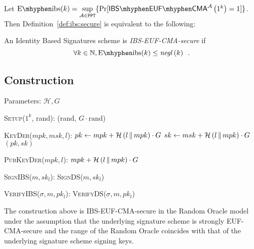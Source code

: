     Let $\mathrm{E \mhyphen ibs}(k) = \underset{\adversary \in
    \mathtt{PPT}}{\sup}\{\Pr[\mathsf{IBS \mhyphen EUF \mhyphen
    CMA}^{\adversary}\left(1^k\right) = 1]\}$. Then
    Definition~\ref{def:ibs:secure} is equivalent to the following:

    \begin{definition}
      \label{def:ibs:secure:sup}
      An Identity Based Signatures scheme is \emph{\textsf{IBS-EUF-CMA}-secure}
      if
      \begin{equation*}
        \forall k \in \mathbb{N}, \mathrm{E \mhyphen ibs}(k) \leq
        \mathit{negl}\left(k\right) \enspace.
      \end{equation*}
    \end{definition}

  \subsection{Construction}
    Parameters: $\mathcal{H}, G$
    \begin{algorithmic}[0]
      \State \textsc{Setup}($1^k$, rand):
      \Indent
        \State \Return (rand, $G \cdot \mathrm{rand}$)
      \EndIndent
    \end{algorithmic}

    \begin{algorithmic}[0]
      \State \textsc{KeyDer}($mpk, msk, l$):
      \Indent
        \State $pk \gets mpk + \mathcal{H}\left(l \,\|\, mpk\right) \cdot G$
        \State $sk \gets msk + \mathcal{H}\left(l \,\|\, mpk\right) \cdot G$
        \State \Return $(pk, sk)$
      \EndIndent
    \end{algorithmic}

    \begin{algorithmic}[0]
      \State \textsc{PubKeyDer}($mpk, l$):
      \Indent
        \State \Return $mpk + \mathcal{H}\left(l \,\|\, mpk\right) \cdot G$
      \EndIndent
    \end{algorithmic}

    \begin{algorithmic}[0]
      \State \textsc{SignIBS}($m, sk_l$):
      \Indent
        \State \Return \textsc{SignDS}($m, sk_l$)
      \EndIndent
    \end{algorithmic}

    \begin{algorithmic}[0]
      \State \textsc{VerifyIBS}($\sigma, m, pk_l$):
      \Indent
        \State \Return \textsc{VerifyDS}($\sigma, m, pk_l$)
      \EndIndent
    \end{algorithmic}

    \begin{theorem}
      \label{theorem:ibs}
      The construction above is \textsf{IBS-EUF-CMA}-secure in the Random Oracle
      model under the assumption that the underlying signature scheme is
      strongly \textsf{EUF-CMA}-secure and the range of the Random Oracle
      coincides with that of the underlying signature scheme signing keys.
    \end{theorem}
